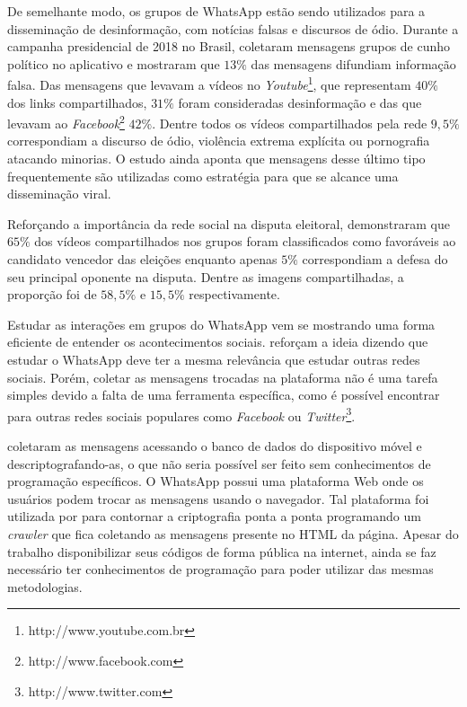 De semelhante modo, os grupos de WhatsApp estão sendo utilizados para a disseminação de desinformação, com notícias falsas e discursos de ódio. Durante a campanha presidencial de 2018 no Brasil,  coletaram mensagens grupos de cunho político no aplicativo e mostraram que $13\%$ das mensagens difundiam informação falsa. Das mensagens que levavam a vídeos no \textit{Youtube}\footnote{http://www.youtube.com.br}, que representam $40\%$ dos links compartilhados, $31\%$ foram consideradas desinformação e das que levavam ao \textit{Facebook}\footnote{\label{foot:facebook}http://www.facebook.com} $42\%$. Dentre todos os vídeos compartilhados pela rede $9,5\%$ correspondiam a discurso de ódio, violência extrema explícita ou pornografia atacando minorias. O estudo ainda aponta que mensagens desse último tipo frequentemente são utilizadas como estratégia para que se alcance uma disseminação viral.

Reforçando a importância da rede social na disputa eleitoral,  demonstraram que $65\%$ dos vídeos compartilhados nos grupos foram classificados como favoráveis ao candidato vencedor das eleições enquanto apenas $5\%$ correspondiam a defesa do seu principal oponente na disputa. Dentre as imagens compartilhadas, a proporção foi de $58,5\%$ e $15,5\%$ respectivamente.

Estudar as interações em grupos do WhatsApp vem se mostrando uma forma eficiente de entender os acontecimentos sociais.  reforçam a ideia dizendo que estudar o WhatsApp deve ter a mesma relevância que estudar outras redes sociais. Porém, coletar as mensagens trocadas na plataforma não é uma tarefa simples devido a falta de uma ferramenta específica, como é possível encontrar para outras redes sociais populares como \textit{Facebook} ou \textit{Twitter}\footnote{http://www.twitter.com}.

 coletaram as mensagens acessando o banco de dados do dispositivo móvel e descriptografando-as, o que não seria possível ser feito sem conhecimentos de programação específicos. O WhatsApp possui uma plataforma Web onde os usuários podem trocar as mensagens usando o navegador. Tal plataforma foi utilizada por  para contornar a criptografia ponta a ponta programando um \textit{crawler} que fica coletando as mensagens presente no HTML da página. Apesar do trabalho disponibilizar seus códigos de forma pública na internet, ainda se faz necessário ter conhecimentos de programação para poder utilizar das mesmas metodologias.

